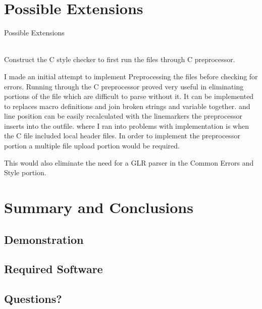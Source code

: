 \documentclass[compress]{beamer}
\begin{document}
\section{Possible Extensions}
\begin{frame}{Possible Extensions}
\begin{description}
	\item[C Preprocessor] \hfill \\
		Construct the C style checker to first run the files through C preprocessor.
	\note
	{
		I made an initial attempt to implement Preprocessing the files before checking for errors. 
		Running through the C preprocessor proved very useful in eliminating portions of the file which are difficult to parse without it.
		It can be implemented to replaces macro definitions and join broken strings and variable together.
		and line position can be easily recalculated with the linemarkers the preprocessor inserts into the outfile.
		where I ran into problems with implementation is when the C file included local header files. 
		In order to implement the preprocessor portion a multiple file upload portion would be required.
		 
		This would also eliminate the need for a GLR parser in the Common Errors and Style portion.
    }
    \item
\end{description}
\end{frame}
\section{Summary and Conclusions}
\subsection{Demonstration}
\subsection{Required Software}
\subsection{Questions?}
\end{document}
